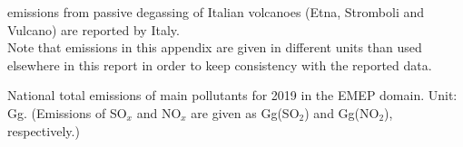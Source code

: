 \sox emissions from passive degassing of Italian volcanoes (Etna, Stromboli and Vulcano) are reported by Italy. \\

Note that emissions in this appendix are given in different units than used elsewhere in this report in order to keep consistency with the reported data.


\clearpage


\renewcommand\bibname{References}    
%


\clearpage
 
\begin{table}
\caption{National total emissions of main pollutants for 2019 in the EMEP
  domain. Unit: Gg. (Emissions of SO$_x$ and NO$_x$ are given as
  Gg(SO$_2$) and Gg(NO$_2$), respectively.)}
\label{tab:2019emisMAIN}

\vspace{15pt}


\end{table}
